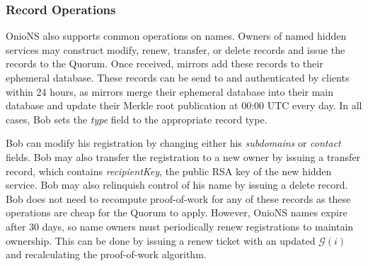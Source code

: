 \documentclass[USenglish,oneside,twocolumn]{article}
\begin{document}




\subsubsection{Record Operations}
\label{sec:recordOps}


OnioNS also supports common operations on names. Owners of named hidden services may construct modify, renew, transfer, or delete records and issue the records to the Quorum. Once received, mirrors add these records to their ephemeral database. These records can be send to and authenticated by clients within 24 hours, as mirrors merge their ephemeral database into their main database and update their Merkle root publication at 00:00 UTC every day. In all cases, Bob sets the \emph{type} field to the appropriate record type.

Bob can modify his registration by changing either his \emph{subdomains} or \emph{contact} fields. Bob may also transfer the registration to a new owner by issuing a transfer record, which contains \emph{recipientKey}, the public RSA key of the new hidden service. Bob may also relinquish control of his name by issuing a delete record. Bob does not need to recompute proof-of-work for any of these records as these operations are cheap for the Quorum to apply. However, OnioNS names expire after 30 days, so name owners must periodically renew registrations to maintain ownership. This can be done by issuing a renew ticket with an updated $ \mathcal{G}(i) $ and recalculating the proof-of-work algorithm.
\end{document}
